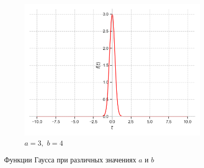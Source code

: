 \documentclass[a4paper, 16pt]{article}
\begin{document}
\begin{figure}[htbp]
\begin{subfigure}{0.3\textwidth}
            \label{fig:gaus_2}
        \end{subfigure}
        \hfill
        \begin{subfigure}{0.3\textwidth}
            \centering
            \includegraphics[width=\linewidth]{gaus_a=3_b=4.png}
            \caption{$a=3,\,\,b=4$}
            \label{fig:gaus_3}
        \end{subfigure}
        \caption{Функции Гаусса при различных значениях $a$ и $b$}
        \label{fig:gauss}
    \end{figure}
\end{document}
